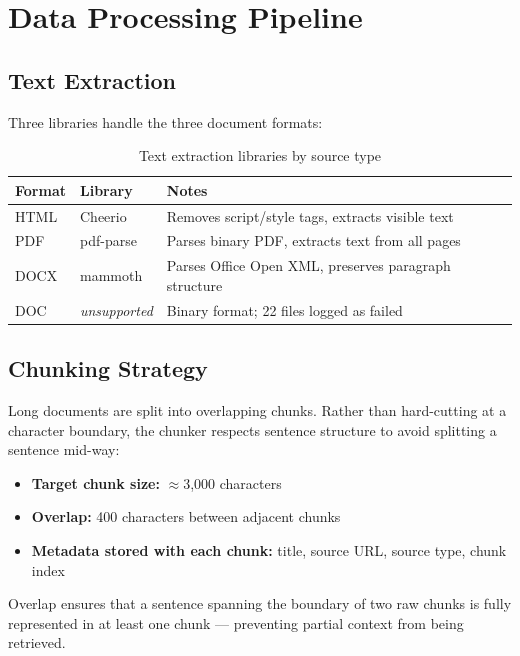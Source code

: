 \documentclass[12pt,a4paper]{report}
\begin{document}
\chapter{Data Processing Pipeline}

\section{Text Extraction}

Three libraries handle the three document formats:

\begin{table}[H]
\centering
\caption{Text extraction libraries by source type}
\begin{tabular}{lll}
\toprule
\textbf{Format} & \textbf{Library} & \textbf{Notes} \\
\midrule
HTML  & Cheerio       & Removes script/style tags, extracts visible text \\
PDF   & pdf-parse     & Parses binary PDF, extracts text from all pages \\
DOCX  & mammoth       & Parses Office Open XML, preserves paragraph structure \\
DOC   & \emph{unsupported} & Binary format; 22 files logged as failed \\
\bottomrule
\end{tabular}
\end{table}

\section{Chunking Strategy}

Long documents are split into overlapping chunks. Rather than hard-cutting at a character boundary, the chunker respects sentence structure to avoid splitting a sentence mid-way:

\begin{itemize}[nosep]
    \item \textbf{Target chunk size:} $\approx$3,000 characters
    \item \textbf{Overlap:} 400 characters between adjacent chunks
    \item \textbf{Metadata stored with each chunk:} title, source URL, source type, chunk index
\end{itemize}

Overlap ensures that a sentence spanning the boundary of two raw chunks is fully represented in at least one chunk --- preventing partial context from being retrieved.
\end{document}
